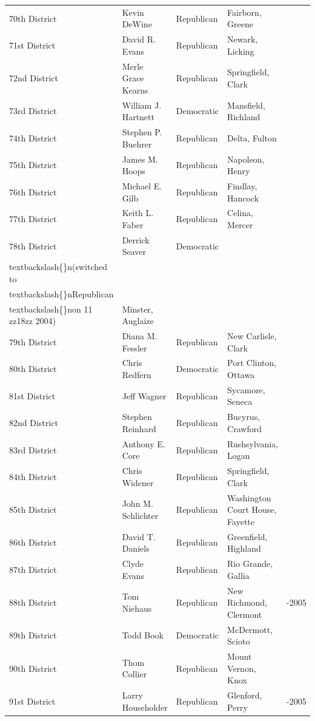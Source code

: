 \documentclass{article}
\begin{document}
\begin{tabular}{lllll}
70th District & Kevin DeWine & Republican & Fairborn, Greene &  \\
71st District & David R. Evans & Republican & Newark, Licking &  \\
72nd District & Merle Grace Kearns & Republican & Springfield, Clark &  \\
73rd District & William J. Hartnett & Democratic & Mansfield, Richland &  \\
74th District & Stephen P. Buehrer & Republican & Delta, Fulton &  \\
75th District & James M. Hoops & Republican & Napoleon, Henry &  \\
76th District & Michael E. Gilb & Republican & Findlay, Hancock &  \\
77th District & Keith L. Faber & Republican & Celina, Mercer &  \\
78th District & Derrick Seaver & Democratic\\textbackslash\{\}n(switched to\\textbackslash\{\}nRepublican\\textbackslash\{\}non 11 zz18zz 2004) & Minster, Auglaize &  \\
79th District & Diana M. Fessler & Republican & New Carlisle, Clark &  \\
80th District & Chris Redfern & Democratic & Port Clinton, Ottawa &  \\
81st District & Jeff Wagner & Republican & Sycamore, Seneca &  \\
82nd District & Stephen Reinhard & Republican & Bucyrus, Crawford &  \\
83rd District & Anthony E. Core & Republican & Rushsylvania, Logan &  \\
84th District & Chris Widener & Republican & Springfield, Clark &  \\
85th District & John M. Schlichter & Republican & Washington Court House, Fayette &  \\
86th District & David T. Daniels & Republican & Greenfield, Highland &  \\
87th District & Clyde Evans & Republican & Rio Grande, Gallia &  \\
88th District & Tom Niehaus & Republican & New Richmond, Clermont & -2005 \\
89th District & Todd Book & Democratic & McDermott, Scioto &  \\
90th District & Thom Collier & Republican & Mount Vernon, Knox &  \\
91st District & Larry Householder & Republican & Glenford, Perry & -2005 \\

\end{tabular}
\end{document}
